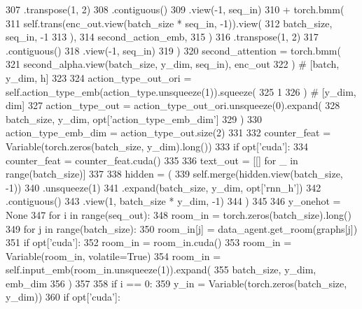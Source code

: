 \begin{DoxyCode}
307             .transpose(1, 2)
308             .contiguous()
309             .view(-1, seq\_in)
310             + torch.bmm(
311                 self.trans(enc\_out.view(batch\_size * seq\_in, -1)).view(
312                     batch\_size, seq\_in, -1
313                 ),
314                 second\_action\_emb,
315             )
316             .transpose(1, 2)
317             .contiguous()
318             .view(-1, seq\_in)
319         )
320         second\_attention = torch.bmm(
321             second\_alpha.view(batch\_size, y\_dim, seq\_in), enc\_out
322         )  \textcolor{comment}{# [batch, y\_dim, h]}
323 
324         action\_type\_out\_ori = self.action\_type\_emb(action\_type.unsqueeze(1)).squeeze(
325             1
326         )  \textcolor{comment}{# [y\_dim, dim]}
327         action\_type\_out = action\_type\_out\_ori.unsqueeze(0).expand(
328             batch\_size, y\_dim, opt[\textcolor{stringliteral}{'action\_type\_emb\_dim'}]
329         )
330         action\_type\_emb\_dim = action\_type\_out.size(2)
331 
332         counter\_feat = Variable(torch.zeros(batch\_size, y\_dim).long())
333         \textcolor{keywordflow}{if} opt[\textcolor{stringliteral}{'cuda'}]:
334             counter\_feat = counter\_feat.cuda()
335 
336         text\_out = [[] \textcolor{keywordflow}{for} \_ \textcolor{keywordflow}{in} range(batch\_size)]
337 
338         hidden = (
339             self.merge(hidden.view(batch\_size, -1))
340             .unsqueeze(1)
341             .expand(batch\_size, y\_dim, opt[\textcolor{stringliteral}{'rnn\_h'}])
342             .contiguous()
343             .view(1, batch\_size * y\_dim, -1)
344         )
345 
346         y\_onehot = \textcolor{keywordtype}{None}
347         \textcolor{keywordflow}{for} i \textcolor{keywordflow}{in} range(seq\_out):
348             room\_in = torch.zeros(batch\_size).long()
349             \textcolor{keywordflow}{for} j \textcolor{keywordflow}{in} range(batch\_size):
350                 room\_in[j] = data\_agent.get\_room(graphs[j])
351             \textcolor{keywordflow}{if} opt[\textcolor{stringliteral}{'cuda'}]:
352                 room\_in = room\_in.cuda()
353             room\_in = Variable(room\_in, volatile=\textcolor{keyword}{True})
354             room\_in = self.input\_emb(room\_in.unsqueeze(1)).expand(
355                 batch\_size, y\_dim, emb\_dim
356             )
357 
358             \textcolor{keywordflow}{if} i == 0:
359                 y\_in = Variable(torch.zeros(batch\_size, y\_dim))
360                 \textcolor{keywordflow}{if} opt[\textcolor{stringliteral}{'cuda'}]:

\end{DoxyCode}
